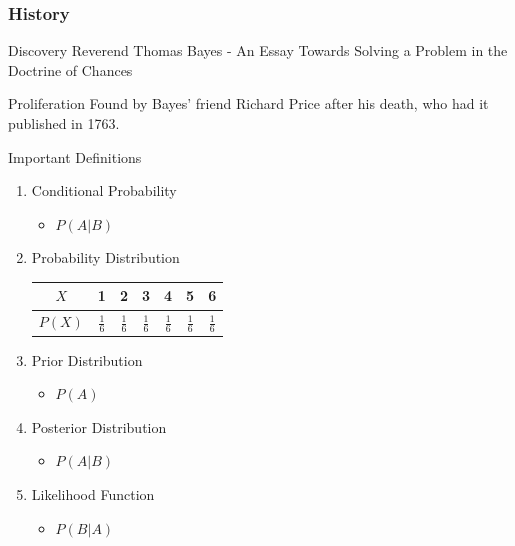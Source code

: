\documentclass[article]{beamer}
\begin{document}
\begin{frame}[fragile]
\frametitle{History}

\begin{block}{Discovery}  %
Reverend Thomas Bayes - An Essay Towards Solving a Problem in the Doctrine of Chances
\end{block}

\begin{block}{Proliferation}
Found by Bayes' friend Richard Price after his death, who had it published in 1763.
\end{block}
\vspace{.4cm}


\end{frame}

\begin{frame}{Important Definitions}

\begin{enumerate}
    \item Conditional Probability
    \begin{itemize}
        \item $P(A|B)$
    \end{itemize}
    \item Probability Distribution \\
    \begin{tabular}{|c|c|c|c|c|c|c|}
    \hline
       $X$  & 1 & 2 & 3 & 4 & 5 & 6   \\
       \hline
       $P(X)$ &  $\frac{1}{6}$ & $\frac{1}{6}$ & $\frac{1}{6}$ & $\frac{1}{6}$ & $\frac{1}{6}$  & $\frac{1}{6}$ \\
       \hline
    \end{tabular}
    \item Prior Distribution
    \begin{itemize}
        \item $P(A)$
    \end{itemize}
    \item Posterior Distribution
    \begin{itemize}
        \item $P(A|B)$
    \end{itemize}
    \item Likelihood Function
    \begin{itemize}
        \item $P(B|A)$
    \end{itemize}
\end{enumerate}
\end{frame}
\end{document}
